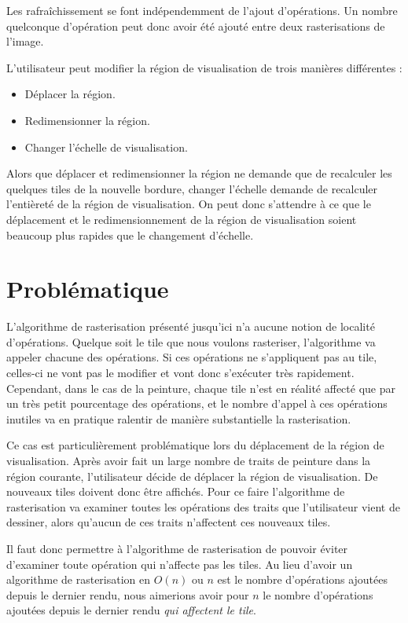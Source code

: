 			Les rafraîchissement se font indépendemment de l'ajout d'opérations. Un nombre quelconque
			d'opération peut donc avoir été ajouté entre deux rasterisations de l'image.

			L'utilisateur peut modifier la région de visualisation de trois manières différentes :

			\begin{itemize}
				\item Déplacer la région.
				\item Redimensionner la région.
				\item Changer l'échelle de visualisation.
			\end{itemize}

			Alors que déplacer et redimensionner la région ne demande que de recalculer les quelques tiles de la nouvelle
			bordure, changer l'échelle demande de recalculer l'entièreté de la région de visualisation. On peut
			donc s'attendre à ce que le déplacement et le redimensionnement de la région de visualisation soient 
			beaucoup plus rapides que le changement d'échelle.

	\section{Problématique}
		L'algorithme de rasterisation présenté jusqu'ici n'a aucune notion de localité d'opérations. Quelque soit le tile
		que nous voulons rasteriser, l'algorithme va appeler chacune des opérations. Si ces opérations ne s'appliquent pas
		au tile, celles-ci ne vont pas le modifier et vont donc s'exécuter très rapidement. Cependant, dans le cas de la 
		peinture, chaque tile n'est en réalité affecté que par un très petit pourcentage des opérations, et le nombre
		d'appel à ces opérations inutiles va en pratique ralentir de manière substantielle la rasterisation.

		Ce cas est particulièrement problématique lors du déplacement de la région de visualisation. Après avoir fait
		un large nombre de traits de peinture dans la région courante, l'utilisateur décide de déplacer la région de
		visualisation. De nouveaux tiles doivent donc être affichés. Pour ce faire l'algorithme de rasterisation va 
		examiner toutes les opérations des traits que l'utilisateur vient de dessiner, alors qu'aucun de ces traits n'affectent
		ces nouveaux tiles. 

		Il faut donc permettre à l'algorithme de rasterisation de pouvoir éviter d'examiner toute opération qui n'affecte
		pas les tiles. Au lieu d'avoir un algorithme de rasterisation en $O(n)$ ou $n$ est le nombre d'opérations
		ajoutées depuis le dernier rendu, nous aimerions avoir pour $n$ le nombre d'opérations ajoutées depuis le dernier
		rendu \emph{qui affectent le tile}.

